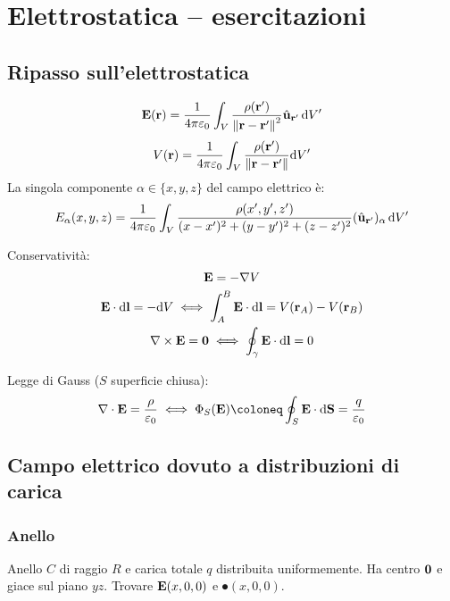 \chapter{Elettrostatica -- esercitazioni}

\section{Ripasso sull'elettrostatica}

\begin{equation}
    \mathbf{E}(\mathbf{r}) = \frac{1}{4\pi\varepsilon_0} \int_V \frac{\rho(\mathbf{r}')}{\left\lVert \mathbf{r} - \mathbf{r}' \right\rVert^2} \hat{\mathbf{u}}_{\mathbf{r}'} \, \mathrm{d} V'
\end{equation}
\begin{equation}
    V(\mathbf{r}) = \frac{1}{4\pi\varepsilon_0} \int_V \frac{\rho(\mathbf{r}')}{\left\lVert \mathbf{r} - \mathbf{r}' \right\rVert} \mathrm{d} V'
\end{equation}
La singola componente $\alpha \in \{x, y, z\}$ del campo elettrico è:
\begin{equation}
    E_\alpha(x,y,z) = \frac{1}{4\pi\varepsilon_0} \int_V \frac{\rho(x',y',z')}{(x - x')^2 + (y - y')^2 + (z - z')^2} (\hat{\mathbf{u}}_{\mathbf{r}'})_\alpha \, \mathrm{d} V'
\end{equation}

Conservatività:
\begin{gather}
    \mathbf{E} = - \nabla V \\
    \mathbf{E} \cdot \mathrm{d} \mathbf{l} = - \mathrm{d} V \iff \int_A^B \mathbf{E} \cdot \mathrm{d} \mathbf{l} = V(\mathbf{r}_A) - V(\mathbf{r}_B) \\
    \nabla \times \mathbf{E} = \mathbf{0}
    \iff
    \oint_\gamma \mathbf{E} \cdot \mathrm{d} \mathbf{l} = 0
\end{gather}

Legge di Gauss ($S$ superficie chiusa):
\begin{equation}
    \diver \E = \frac{\rho}{\eps_0}
    \iff
    \Phi_S(\E) \coloneq \oint_S \E \sde = \frac{q}{\eps_0}
\end{equation}

\section{Campo elettrico dovuto a distribuzioni di carica}

\subsection{Anello}

Anello $C$ di raggio $R$ e carica totale $q$ distribuita uniformemente.
Ha centro $\mathbf{0}$ e giace sul piano $yz$.
Trovare $\mathbf{E}(x, 0, 0)$ e $\spot(x, 0, 0)$.

